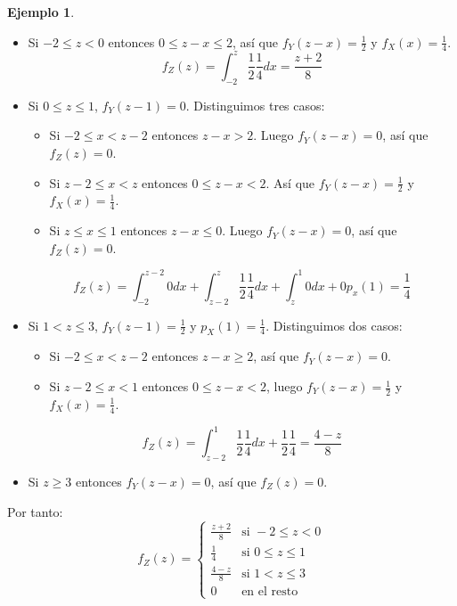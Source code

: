 \documentclass{report}
\theoremstyle{remark}
\theoremstyle{remark}
\theoremstyle{remark}
\theoremstyle{definition}
\theoremstyle{definition}
\theoremstyle{definition}
\newtheorem*{example}{Ejemplo}
\theoremstyle{definition}
\begin{document}
\begin{example}
\begin{itemize}
        \item Si $-2 \leq z < 0$ entonces $0 \leq z-x \leq 2$, así que $f_Y(z-x) = \frac{1}{2}$ y $f_X(x) = \frac{1}{4}$.
              $$f_Z(z) = \int_{-2}^z \frac{1}{2} \frac{1}{4} dx = \frac{z+2}{8}$$
        \item Si $0 \leq z \leq 1$, $f_Y(z-1) = 0$.
              Distinguimos tres casos:
              \begin{itemize}
                  \item Si $-2 \leq x < z-2$ entonces $z-x > 2$.
                        Luego $f_Y(z-x) = 0$, así que $f_Z(z) = 0$.
                  \item Si $z-2 \leq x < z$ entonces $0 \leq z-x < 2$.
                        Así que $f_Y(z-x) = \frac{1}{2}$ y $f_X(x) = \frac{1}{4}$.
                  \item Si $z \leq x \leq 1$ entonces $z-x \leq 0$.
                        Luego $f_Y(z-x) = 0$, así que $f_Z(z) = 0$.
              \end{itemize}
              $$f_Z(z) = \int_{-2}^{z-2} 0 dx + \int_{z-2}^z \frac{1}{2} \frac{1}{4} dx + \int_z^1 0 dx + 0p_x(1) = \frac{1}{4}$$
        \item Si $1 < z \leq 3$, $f_Y(z-1) = \frac{1}{2}$ y $p_X(1) = \frac{1}{4}$.
              Distinguimos dos casos:
              \begin{itemize}
                  \item Si $-2 \leq x < z-2$ entonces $z-x \geq 2$, así que $f_Y(z-x) = 0$.
                  \item Si $z-2 \leq x < 1$ entonces $0 \leq z-x < 2$, luego $f_Y(z-x) = \frac{1}{2}$ y $f_X(x) = \frac{1}{4}$.
              \end{itemize}
              $$f_Z(z) = \int_{z-2}^1 \frac{1}{2} \frac{1}{4} dx + \frac{1}{2} \frac{1}{4} = \frac{4-z}{8}$$
        \item Si $z \geq 3$ entonces $f_Y(z-x) = 0$, así que $f_Z(z) = 0$.
    \end{itemize}
    Por tanto:
    $$f_Z(z) = \begin{cases}
            \frac{z+2}{8} & \text{si } -2 \leq z < 0   \\
            \frac{1}{4}   & \text{si } 0 \leq z \leq 1 \\
            \frac{4-z}{8} & \text{si } 1 < z \leq 3    \\
            0             & \text{en el resto}
        \end{cases}$$
\end{example}
\end{document}
